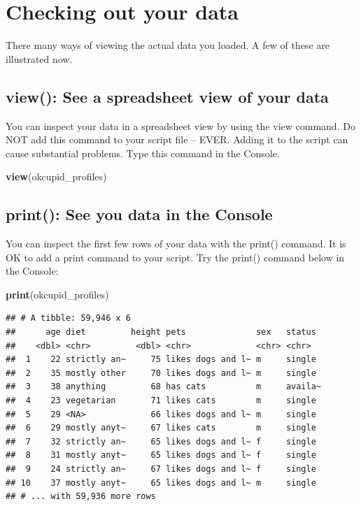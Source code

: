 \documentclass[
]{krantz}
\makeatletter
\newenvironment{Shaded}{\begin{snugshade}}{\end{snugshade}}
\newcommand{\KeywordTok}[1]{\textcolor[rgb]{0.27,0.27,0.27}{\textbf{#1}}}
\newcommand{\NormalTok}[1]{#1}
\newenvironment{kframe}{%
\medskip{}
\setlength{\fboxsep}{.8em}
 \def\at@end@of@kframe{}%
 \ifinner\ifhmode%
  \def\at@end@of@kframe{\end{minipage}}%
  \begin{minipage}{\columnwidth}%
 \fi\fi%
 \def\FrameCommand##1{\hskip\@totalleftmargin \hskip-\fboxsep
 \colorbox{shadecolor}{##1}\hskip-\fboxsep
     \hskip-\linewidth \hskip-\@totalleftmargin \hskip\columnwidth}%
 \MakeFramed {\advance\hsize-\width
   \@totalleftmargin\z@ \linewidth\hsize
   \@setminipage}}%
 {\par\unskip\endMakeFramed%
 \at@end@of@kframe}
\renewenvironment{Shaded}{\begin{kframe}}{\end{kframe}}
\makeatother
\begin{document}
\hypertarget{checking-out-your-data}{%
\section{Checking out your data}\label{checking-out-your-data}}

There many ways of viewing the actual data you loaded. A few of these are illustrated now.

\hypertarget{view-see-a-spreadsheet-view-of-your-data}{%
\subsection{view(): See a spreadsheet view of your data}\label{view-see-a-spreadsheet-view-of-your-data}}

You can inspect your data in a spreadsheet view by using the view command. Do NOT add this command to your script file -- EVER. Adding it to the script can cause substantial problems. Type this command in the Console.

\begin{Shaded}
\begin{Highlighting}[]
\KeywordTok{view}\NormalTok{(okcupid_profiles)}
\end{Highlighting}
\end{Shaded}

\hypertarget{print-see-you-data-in-the-console}{%
\subsection{print(): See you data in the Console}\label{print-see-you-data-in-the-console}}

You can inspect the first few rows of your data with the print() command. It is OK to add a print command to your script. Try the print() command below in the Console:

\begin{Shaded}
\begin{Highlighting}[]
\KeywordTok{print}\NormalTok{(okcupid_profiles)}
\end{Highlighting}
\end{Shaded}

\begin{verbatim}
## # A tibble: 59,946 x 6
##      age diet         height pets              sex   status 
##    <dbl> <chr>         <dbl> <chr>             <chr> <chr>  
##  1    22 strictly an~     75 likes dogs and l~ m     single 
##  2    35 mostly other     70 likes dogs and l~ m     single 
##  3    38 anything         68 has cats          m     availa~
##  4    23 vegetarian       71 likes cats        m     single 
##  5    29 <NA>             66 likes dogs and l~ m     single 
##  6    29 mostly anyt~     67 likes cats        m     single 
##  7    32 strictly an~     65 likes dogs and l~ f     single 
##  8    31 mostly anyt~     65 likes dogs and l~ f     single 
##  9    24 strictly an~     67 likes dogs and l~ f     single 
## 10    37 mostly anyt~     65 likes dogs and l~ m     single 
## # ... with 59,936 more rows
\end{verbatim}
\end{document}
